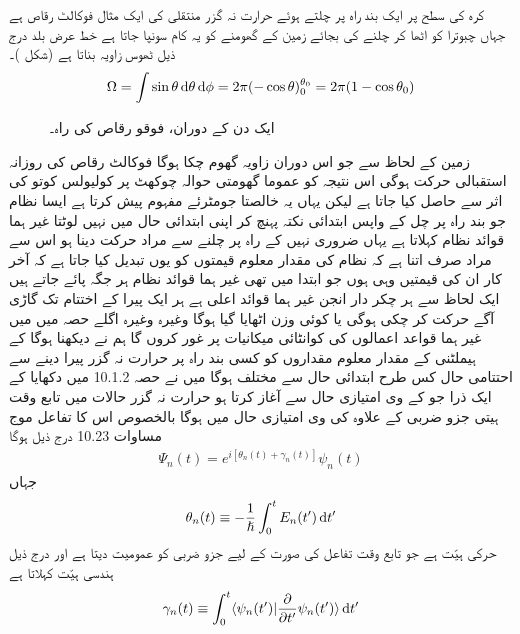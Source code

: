  کرہ کی سطح پر ایک بند راہ پر چلتے ہوئے حرارت نہ گزر منتقلی کی ایک مثال فوکالٹ  رقاص  ہے جہاں چبوترا کو اٹھا کر چلنے کی بجائے زمین کے گھومنے کو یہ کام سونپا جاتا ہے خط عرض بلد  درج ذیل ٹھوس زاویہ بناتا ہے  (شکل   )۔ 
\begin{align}
\Omega = \int \sin \theta \dif \theta \dif \phi = 2\pi (- \cos \theta)_0^{\theta_0} = 2 \pi (1 - \cos \theta_0)
\end{align}
%
\begin{figure}
\centering
{}
\caption{ایک دن کے دوران، فوقو رقاص کی راہ۔}
\label{شکل_حرارت_نا_گزر_فوقو_رقاص_ایک_دن}
\end{figure}



زمین کے لحاظ سے جو اس دوران  زاویہ گھوم چکا ہوگا فوکالٹ   رقاص   کی روزانہ استقبالی حرکت   ہوگی اس نتیجہ کو عموما گھومتی حوالہ چوکھٹ پر كوليولس کوتو کی اثر سے حاصل کیا جاتا ہے لیکن یہاں یہ خالصتا جومٹرئے مفہوم پیش کرتا ہے ایسا نظام جو بند راہ پر چل کے واپس ابتدائی نکتہ پہنچ کر اپنی ابتدائی حال میں نہیں لوٹتا غیر ہما قوائد نظام کہلاتا ہے یہاں ضروری نہیں کے راہ پر چلنے سے مراد حرکت دینا ہو اس سے مراد صرف اتنا ہے کہ نظام کی مقدار معلوم قیمتوں کو یوں تبدیل کیا جاتا ہے کہ آخر کار ان کی قیمتیں وہی ہوں جو ابتدا میں تھی غیر ہما قوائد نظام ہر جگہ پائے جاتے ہیں ایک لحاظ سے ہر چکر دار انجن غیر ہما قوائد اعلی ہے ہر ایک پیرا کے اختتام تک گاڑی آگے حرکت کر چکی ہوگی یا کوئی وزن اٹھایا گیا ہوگا وغیرہ وغیرہ اگلے حصہ میں میں غیر ہما قواعد اعمالوں کی کوانٹائی میکانیات پر غور کروں گا ہم نے دیکھنا ہوگا کے ہيملٹنی کے مقدار معلوم مقداروں کو کسی بند راہ پر حرارت نہ گزر پیرا دینے سے احتتامی حال کس طرح ابتدائی حال سے مختلف ہوگا 
میں نے حصہ 10.1.2 میں دکھایا کے ایک ذرا جو  کے  وی امتیازی حال سے آغاز کرتا ہو حرارت نہ گزر حالات میں تابع وقت ہيتى جزو ضربی کے علاوہ  کی  وی امتیازی حال میں ہوگا بالخصوص اس کا تفاعل موج مساوات 10.23 درج ذیل ہوگا 
\begin{align}
\Psi_n (t) = e^{i[\theta_n (t) + \gamma_n (t)]} \psi_n (t)
\end{align} 
جہاں 
\begin{align}
\theta_n (t) \equiv - \frac{1}{\hslash} \int_0^t E_n (t') \dif t'
\end{align}
 حرکی ہیّت ہے جو تابع وقت تفاعل  کی صورت کے لیے جزو ضربی  کو عمومیت دیتا ہے اور درج ذیل ہندسی ہیّت کہلاتا ہے
\begin{align}
\gamma_n(t)\equiv \int_0^t \langle \psi_n(t')|\frac{\partial}{\partial t'}\psi_n(t')\rangle \dif t'
\end{align}

